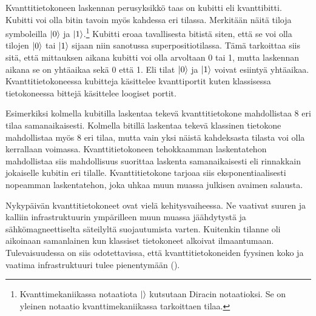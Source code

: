 Kvanttitietokoneen laskennan perusyksikkö taas on kubitti eli kvanttibitti. Kubitti voi olla bitin tavoin myös kahdessa eri tilassa. Merkitään näitä tiloja symboleilla
$\ket{0}$ ja $\ket{1}$.\footnote{Kvanttimekaniikassa notaatiota $\ket{}$ kutsutaan Diracin notaatioksi. Se on yleinen notaatio kvanttimekaniikassa tarkoittaen tilaa.} Kubitti eroaa tavallisesta bitistä siten, että se voi olla tilojen $\ket{0}$ tai $\ket{1}$ sijaan niin sanotussa superpositiotilassa. Tämä tarkoittaa siis sitä, että mittauksen aikana kubitti voi olla arvoltaan 0 tai 1, mutta laskennan aikana se on yhtäaikaa sekä 0 että 1. Eli tilat $\ket{0}$ ja $\ket{1}$ voivat esiintyä yhtäaikaa. Kvanttitietokoneessa kubitteja käsittelee kvanttiportit kuten klassisessa tietokoneessa bittejä käsittelee loogiset portit.

Esimerkiksi kolmella kubitilla laskentaa tekevä kvanttitietokone mahdollistaa 8 eri tilaa samanaikaisesti. Kolmella bitillä laskentaa tekevä klassinen tietokone mahdollistaa myös 8 eri tilaa, mutta vain yksi näistä kahdeksasta tilasta voi olla kerrallaan voimassa. Kvanttitietokoneen tehokkaamman laskentatehon mahdollistaa siis mahdollisuus suorittaa laskenta samanaikaisesti eli rinnakkain jokaiselle kubitin eri tilalle. Kvanttitietokone tarjoaa siis eksponentiaalisesti nopeamman laskentatehon, joka uhkaa muun muassa julkisen avaimen salausta.

Nykypäivän kvanttitietokoneet ovat vielä kehitysvaiheessa. Ne vaativat suuren ja kalliin infrastruktuurin ympärilleen muun muassa jäähdytystä ja sähkömagneettiselta säteilyltä suojautumista varten. Kuitenkin tilanne oli aikoinaan samanlainen kun klassiset tietokoneet alkoivat ilmaantumaan. Tulevaisuudessa on siis odotettavissa, että kvanttitietokoneiden fyysinen koko ja vaatima infrastruktuuri tulee pienentymään (\cite{doi:10.1080/23742917.2016.1226650}).